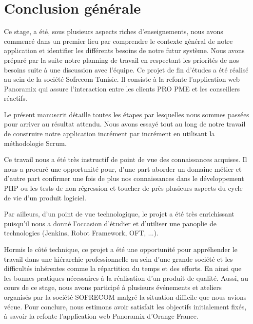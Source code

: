 \chapter*{Conclusion générale}

Ce stage, a été, sous plusieurs aspects riches d'enseignements, nous avons commencé dans un premier lieu par comprendre le contexte général de notre application et identifier les différents besoins de notre futur système. Nous avons préparé par la suite notre planning de travail en respectant les priorités de nos besoins suite à une discussion avec l'équipe. Ce projet de fin d'études a été réalisé au sein de la société Sofrecom Tunisie. Il consiste à la refonte l'application web Panoramix qui assure l'interaction entre les clients PRO PME et les conseillers réactifs.\\\newline

Le présent manuscrit détaille toutes les étapes par lesquelles nous sommes passées pour arriver au résultat attendu. Nous avons essayé tout au long de notre travail de construire notre application incrément par incrément en utilisant la méthodologie Scrum.\\\newline

Ce travail nous a été très instructif de point de vue des connaissances acquises. Il nous a procuré une opportunité pour, d'une part aborder un domaine métier et d'autre part confirmer une fois de plus nos connaissances dans le développement PHP ou les tests de non régression et toucher de près plusieurs aspects du cycle de vie d'un produit logiciel.\\\newline

Par ailleurs, d'un point de vue technologique, le projet a été très enrichissant puisqu'il nous a donné l'occasion d'étudier et d'utiliser une panoplie de technologies (Jenkins, Robot Framework, OFT, ...).\\\newline

Hormis le côté technique, ce projet a été une opportunité pour appréhender le travail dans une hiérarchie professionnelle au sein d'une grande société et les difficultés inhérentes comme la répartition du temps et des efforts. En ainsi que les bonnes pratiques nécessaires à la réalisation d'un produit de qualité. Aussi, au cours de ce stage, nous avons participé à plusieurs événements et ateliers organisés par la société SOFRECOM malgré la situation difficile que nous avions vécue. Pour conclure, nous estimons avoir satisfait les objectifs initialement fixés, à savoir la refonte l'application web Panoramix d'Orange France.\\\newline

